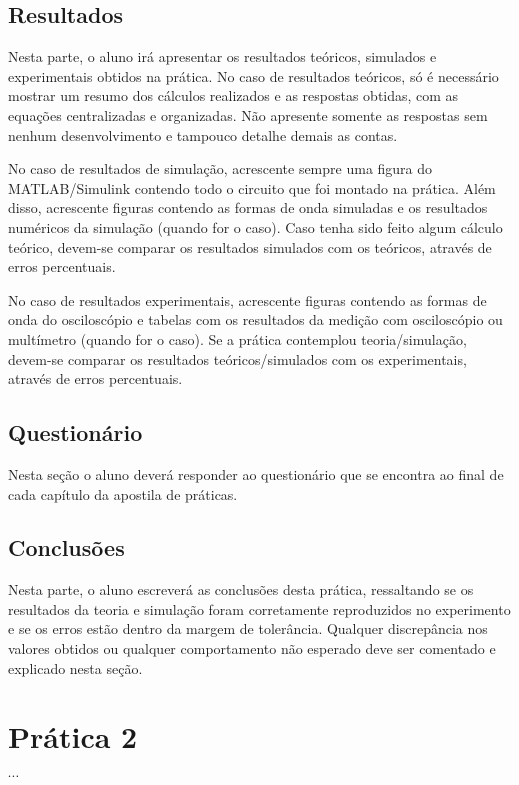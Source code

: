 \documentclass[12pt]{article}
\begin{document}
\subsection{Resultados}
\label{sec:orgb1b3a85}
Nesta parte, o aluno irá apresentar os resultados teóricos, simulados e experimentais obtidos na prática.
No caso de resultados teóricos, só é necessário mostrar um resumo dos cálculos realizados e as respostas obtidas, com as equações centralizadas e organizadas. Não apresente somente as respostas sem nenhum desenvolvimento e tampouco detalhe demais as contas.

No caso de resultados de simulação, acrescente sempre uma figura do MATLAB/Simulink contendo todo o circuito que foi montado na prática. Além disso, acrescente figuras contendo as formas de onda simuladas e os resultados numéricos da simulação (quando for o caso). Caso tenha sido feito algum cálculo teórico, devem-se comparar os resultados simulados com os teóricos, através de erros percentuais.

No caso de resultados experimentais, acrescente figuras contendo as formas de onda do osciloscópio e tabelas com os resultados da medição com osciloscópio ou multímetro (quando for o caso). Se a prática contemplou teoria/simulação, devem-se comparar os resultados teóricos/simulados com os experimentais, através de erros percentuais.

\subsection{Questionário}
\label{sec:orgd9612bd}
Nesta seção o aluno deverá responder ao questionário que se encontra ao final de cada capítulo da apostila de práticas.

\subsection{Conclusões}
\label{sec:org9eafb9a}

Nesta parte, o aluno escreverá as conclusões desta prática, ressaltando se os resultados da teoria e simulação foram corretamente reproduzidos no experimento e se os erros estão dentro da margem de tolerância. Qualquer discrepância nos valores obtidos ou qualquer comportamento não esperado deve ser comentado e explicado nesta seção.

\section{Prática 2}
\label{sec:orgd8d60b5}
\(\cdots\)
\end{document}
